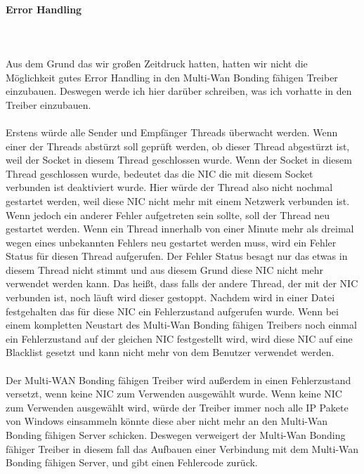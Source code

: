 \paragraph{Error Handling}
\ \\\\
Aus dem Grund das wir großen Zeitdruck hatten, hatten wir nicht die Möglichkeit gutes Error Handling in den Multi-Wan Bonding fähigen Treiber einzubauen. Deswegen werde ich hier darüber schreiben, was ich vorhatte in den Treiber einzubauen.
\\\\
Erstens würde alle Sender und Empfänger Threads überwacht werden. Wenn einer der Threads abstürzt soll geprüft werden, ob dieser Thread abgestürzt ist, weil der Socket in diesem Thread geschlossen wurde. Wenn der Socket in diesem Thread geschlossen wurde, bedeutet das die NIC die mit diesem Socket verbunden ist deaktiviert wurde. Hier würde der Thread also nicht nochmal gestartet werden, weil diese NIC nicht mehr mit einem Netzwerk verbunden ist. Wenn jedoch ein anderer Fehler aufgetreten sein sollte, soll der Thread neu gestartet werden. Wenn ein Thread innerhalb von einer Minute mehr als dreimal wegen eines unbekannten Fehlers neu gestartet werden muss, wird ein Fehler Status für diesen Thread aufgerufen. Der Fehler Status besagt nur das etwas in diesem Thread nicht stimmt und aus diesem Grund diese NIC nicht mehr verwendet werden kann. Das heißt, dass falls der andere Thread, der mit der NIC verbunden ist, noch läuft wird dieser gestoppt. Nachdem wird in einer Datei festgehalten das für diese NIC ein Fehlerzustand aufgerufen wurde. Wenn bei einem kompletten Neustart des Multi-Wan Bonding fähigen Treibers noch einmal ein Fehlerzustand auf der gleichen NIC festgestellt wird, wird diese NIC auf eine Blacklist gesetzt und kann nicht mehr von dem Benutzer verwendet werden.
\\\\
Der Multi-WAN Bonding fähigen Treiber wird außerdem in einen Fehlerzustand versetzt, wenn keine NIC zum Verwenden ausgewählt wurde. Wenn keine NIC zum Verwenden ausgewählt wird, würde der Treiber immer noch alle IP Pakete von Windows einsammeln könnte diese aber nicht mehr an den Multi-Wan Bonding fähigen Server schicken. Deswegen verweigert der Multi-Wan Bonding fähiger Treiber in diesem fall das Aufbauen einer Verbindung mit dem Multi-Wan Bonding fähigen Server, und gibt einen Fehlercode zurück. 

